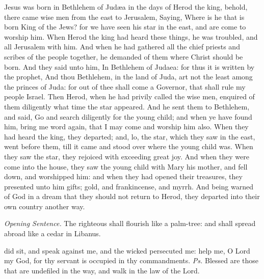  Jesus was born in Bethlehem of Jud{\ae}a in the days of Herod the king, behold, there came wise men from the east to Jerusalem, Saying, Where is he that is born King of the Jews? for we have seen his star in the east, and are come to worship him. When Herod the king had heard these things, he was troubled, and all Jerusalem with him. And when he had gathered all the chief priests and scribes of the people together, he demanded of them where Christ should be born. And they said unto him, In Bethlehem of Judaea: for thus it is written by the prophet, And thou Bethlehem, in the land of Juda, art not the least among the princes of Juda: for out of thee shall come a Governor, that shall rule my people Israel. Then Herod, when he had privily called the wise men, enquired of them diligently what time the star appeared. And he sent them to Bethlehem, and said, Go and search diligently for the young child; and when ye have found him, bring me word again, that I may come and worship him also. When they had heard the king, they departed; and, lo, the star, which they saw in the east, went before them, till it came and stood over where the young child was. When they saw the star, they rejoiced with exceeding great joy. And when they were come into the house, they saw the young child with Mary his mother, and fell down, and worshipped him: and when they had opened their treasures, they presented unto him gifts; gold, and frankincense, and myrrh. And being warned of God in a dream that they should not return to Herod, they departed into their own country another way.

\clearpage
{}

\par\noindent
\textit{Opening Sentence.} The righteous shall flourish like a palm-tree: and shall spread abroad like a cedar in Libanus.


\introit
{} did sit, and speak against me, and the wicked persecuted me: help me, O Lord my God, for thy servant is occupied in thy commandments. \textit{Ps.} Blessed are those that are undefiled in the way, and walk in the law of the Lord.

